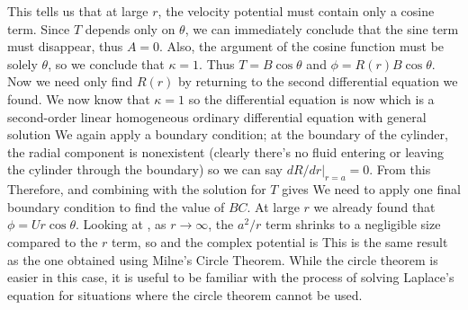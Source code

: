 \documentclass[12pt]{book}
\begin{document}
{
This tells us that at large $r$, the velocity potential must contain only a cosine term. Since $T$ depends only on $\theta$, we can immediately conclude that the sine term must disappear, thus $A=0$.  Also, the argument of the cosine function must be solely $\theta$, so we conclude that $\kappa = 1$. 
Thus $T = B\cos\theta$ and $\phi = R(r)B\cos\theta$.  Now we need only find $R(r)$ by returning to the second differential equation we found.  We now know that $\kappa = 1$ so the differential equation is now
which is a second-order linear homogeneous ordinary differential equation with general solution
We again apply a boundary condition; at the boundary of the cylinder, the radial component is nonexistent (clearly there's no fluid entering or leaving the cylinder through the boundary) so we can say $dR/dr|_{r=a} = 0$.  From this
Therefore,
and combining with the solution for $T$ gives
We need to apply one final boundary condition to find the value of $BC$.  At large $r$ we already found that $\phi = Ur\cos\theta$.  Looking at , as $r\rightarrow\infty$, the $a^2 / r$ term shrinks to a negligible size compared to the $r$ term, so 
and the complex potential is
This is the same result as the one obtained using Milne's Circle Theorem.  While the circle theorem is easier in this case, it is useful to be familiar with the process of solving Laplace's equation for situations where the circle theorem cannot be used.

}

\stopAssignment
\end{document}
